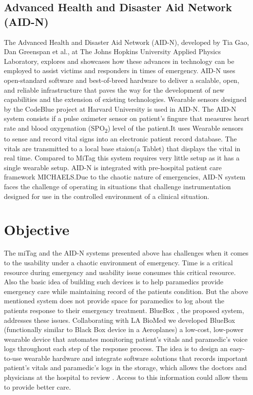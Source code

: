 \subsection{Advanced Health
	and Disaster Aid Network (AID-N)}
\hspace{10mm}The Advanced Health and Disaster Aid Network (AID-N), developed by Tia Gao, Dan Greenspan et al., \cite{AID-N} at The Johns Hopkins University Applied Physics Laboratory, explores and showcases how these advances in technology can be employed to assist victims and responders in times of emergency. AID-N uses open-standard software and best-of-breed hardware to deliver a scalable, open, and reliable infrastructure that paves the way for the development of new capabilities and the extension of existing technologies. 
Wearable sensors designed by the CodeBlue project at Harvard University is used in AID-N. The AID-N system consists if a pulse oximeter sensor on patient's fingure that measures heart rate and blood oxygenation (SPO\textsubscript{2}) level of the patient.It uses Wearable sensors to sense and record vital signs into an electronic patient record database. The vitals are transmitted to a local base staion(a Tablet) that displays the vital in real time. Compared to MiTag this system requires very little setup as it has a single wearable setup. AID-N is integrated with pre-hospital patient care framework MICHAELS.Due to the chaotic nature of emergencies, AID-N system
faces the challenge of operating in situations that challenge instrumentation designed for use in
the controlled environment of a clinical situation. 


\section{Objective}
\hspace{10mm}The miTag and the AID-N systems presented above has challenges when it comes to the usability under a chaotic environment of emergency. Time is a critical resource during emergency and usability issue consumes this critical resource. Also the basic idea of building such devices is to help paramedics provide emergency care while maintaining record of the patients condition. But the above mentioned system does not provide space for paramedics to log about the patients response to their emergency treatment. BlueBox , the proposed system, addresses these issues. Collaborating with LA BioMed we developed BlueBox (functionally similar to Black Box device in a Aeroplanes) a low-cost, low-power wearable device that automates monitoring patient’s vitals and paramedic's voice logs throughout each step of the response process. The idea is to design an easy-to-use wearable hardware and integrate software solutions that records important  patient’s vitals and paramedic's logs in the storage, which allows the doctors and physicians at the hospital to review . Access to this information could allow them to provide better care.

